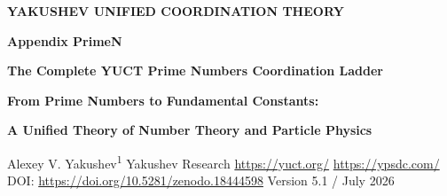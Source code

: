 \documentclass[12pt,a4paper]{article}
\theoremstyle{remark}
\newcommand{\Keff}{K_{\mathrm{eff}}}
\newcommand{\kappac}{\kappa_c}
\begin{document}
	
	\begin{titlepage}
		\begin{center}
			\vspace*{1cm}
			{\Huge\bfseries YAKUSHEV UNIFIED COORDINATION THEORY\par}
			\vspace{0.5cm}
			{\Huge\bfseries Appendix PrimeN\par}
			\vspace{0.3cm}
			{\Large\bfseries The Complete YUCT Prime Numbers Coordination Ladder\par}
			\vspace{0.2cm}
			{\Large\bfseries From Prime Numbers to Fundamental Constants:\par}
			\vspace{0.2cm}
			{\Large\bfseries A Unified Theory of Number Theory and Particle Physics\par}
			
			\vspace{1.5cm}
			{\Large Alexey V. Yakushev\textsuperscript{1}}
			\vspace{0.5cm}
			{\normalsize Yakushev Research}
			\vspace{0.3cm}
			{\normalsize \url{https://yuct.org/}}
			\vspace{0.3cm}
			{\normalsize \url{https://ypsdc.com/}}
			\vspace{1cm}
			{\normalsize DOI: \url{https://doi.org/10.5281/zenodo.18444598}}
			\vspace{0.5cm}
			{\normalsize Version 5.1 / July 2026}
			\vfill
			
			\begin{abstract}
				\noindent
				This appendix presents the complete YUCT Prime Numbers Coordination Ladder, from the initial discovery of the universal error law governing prime fluctuations to the derivation of the fundamental constants of particle physics from the same algebraic structure.
				
				\textbf{Part I} establishes the connection between prime numbers and the universal error law \(\varepsilon = \kappac \alpha \Keff^{-\beta}\) (\(\beta = 2/3\), \(\kappac = 1/3\)), derives the parameter-free correction to Rosser's formula, and discovers cascade phase transitions of the vacuum lattice with step \(\Delta N = 16.5\).
				

\end{abstract}
\end{center}
\end{titlepage}
\end{document}
